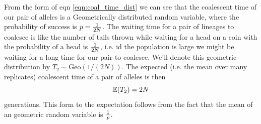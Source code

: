 From the form of eqn \eqref{eqn:coal_time_dist} we can see that the coalescent time of our pair of alleles is a Geometrically distributed random variable, where the probability of success is $p=\nicefrac{1}{2N}$. The waiting time for a pair of lineages to coalesce is like the number of tails thrown while waiting for a head on a coin with the probability of a head is $\nicefrac{1}{2N}$, i.e. id the population is large we might be waiting for a long time for our pair to coalesce. We'll denote this geometric distribution by $T_2 \sim  \text{Geo}(1/(2N))$. 
The expected (i.e. the mean over many replicates) coalescent time of a pair of alleles is then
\begin{equation}
\E(T_2) = 2N
\end{equation}
generations. This form to the expectation follows from the fact that the mean of an geometric random variable is $\nicefrac{1}{p}$.\\


